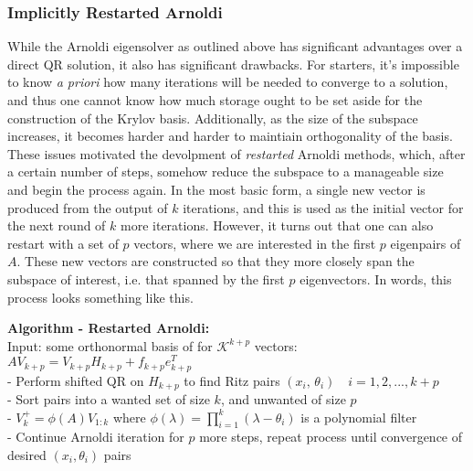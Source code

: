\documentclass[11pt]{article}
\newcommand{\K}[1]{\mathcal{K}^{#1}}
\begin{document}
\subsubsection{Implicitly Restarted Arnoldi}

While the Arnoldi eigensolver as outlined above has significant advantages over a direct QR solution, it also has significant drawbacks. For starters, it's impossible to know \textit{a priori} how many iterations will be needed to converge to a solution, and thus one cannot know how much storage ought to be set aside for the construction of the Krylov basis. Additionally, as the size of the subspace increases, it becomes harder and harder to maintiain orthogonality of the basis. These issues motivated the devolpment of \textit{restarted} Arnoldi methods, which, after a certain number of steps, somehow reduce the subspace to a manageable size and begin the process again. In the most basic form, a single new vector is produced from the output of $k$ iterations, and this is used as the initial vector for the next round of $k$ more iterations. However, it turns out that one can also restart with a set of $p$ vectors, where we are interested in the first $p$ eigenpairs of $A$. These new vectors are constructed so that they more closely span the subspace of interest, i.e. that spanned by the first $p$ eigenvectors. In words, this process looks something like this.

\begin{framed}
  \noindent \textbf{Algorithm - Restarted Arnoldi:} \\
  \hspace*{5mm} Input: some orthonormal basis of for $\K{k+p}$ vectors: $A V_{k+p} = V_{k+p} H_{k+p} + f_{k+p} e_{k+p}^T$ \\
  \hspace*{5mm} - Perform shifted QR on $H_{k+p}$ to find Ritz pairs $(x_i, \, \theta_i) \quad i=1,2,...,k+p$ \\
  \hspace*{5mm} - Sort pairs into a wanted set of size $k$, and unwanted of size $p$ \\
  \hspace*{5mm} - $V_{k}^+ = \phi(A) V_{1:k}$ where $\phi(\lambda) = \prod \limits_{i=1}^k (\lambda - \theta_i)$ is a polynomial filter \\
  \hspace*{5mm} - Continue Arnoldi iteration for $p$ more steps, repeat process until convergence of desired $(x_i, \theta_i)$ pairs
\end{framed}
\end{document}
